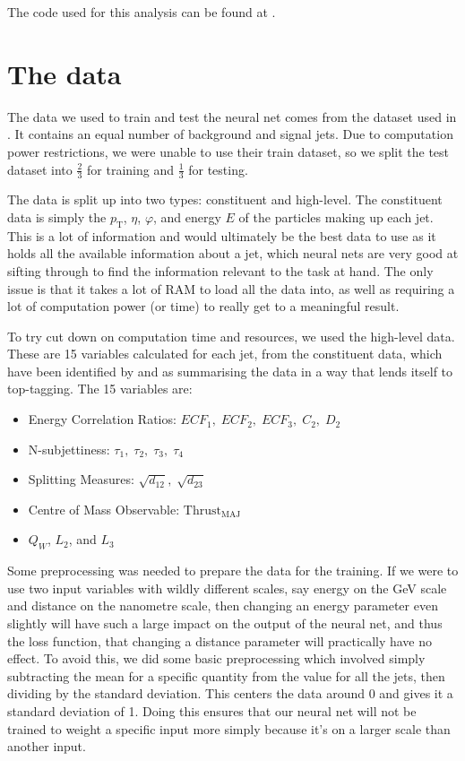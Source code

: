 \documentclass[11pt]{article}
\numberwithin{equation}{section}
\numberwithin{figure}{section}
\numberwithin{table}{section}
\begin{document}
The code used for this analysis can be found at \cite{proj_code}.

\section{The data}\label{sec:Data}
The data we used to train and test the neural net comes from the dataset used in \cite{top-tagging-data}. It contains an equal number of background and signal jets. Due to computation power restrictions, we were unable to use their train dataset, so we split the test dataset into $\frac 23$ for training and $\frac 13$ for testing.

The data is split up into two types: constituent and high-level. The constituent data is simply the $p_\mathrm{T}$, $\eta$, $\varphi$, and energy $E$ of the particles making up each jet. This is a lot of information and would ultimately be the best data to use as it holds all the available information about a jet, which neural nets are very good at sifting through to find the information relevant to the task at hand. The only issue is that it takes a lot of RAM to load all the data into, as well as requiring a lot of computation power (or time) to really get to a meaningful result. 

To try cut down on computation time and resources, we used the high-level data. These are 15 variables calculated for each jet, from the constituent data, which have been identified by \cite{ATL-PHYS-PUB-2021-028} and \cite{ATL-PHYS-PUB-2017-004} as summarising the data in a way that lends itself to top-tagging. The 15 variables are:

\begin{itemize}
    \item Energy Correlation Ratios: $ECF_1,\; ECF_2,\; ECF_3,\; C_2,\; D_2$
    \item N-subjettiness: $\tau_1,\; \tau_2,\; \tau_3,\; \tau_4$
    \item Splitting Measures: $\sqrt{d_{12}},\; \sqrt{d_{23}}$
    \item Centre of Mass Observable: $\mathrm{Thrust}_\mathrm{MAJ}$
    \item $Q_W$, $L_2$, and $L_3$
\end{itemize}

Some preprocessing was needed to prepare the data for the training. If we were to use two input variables with wildly different scales, say energy on the \si[]{\giga\electronvolt} scale and distance on the nanometre scale, then changing an energy parameter even slightly will have such a large impact on the output of the neural net, and thus the loss function, that changing a distance parameter will practically have no effect. To avoid this, we did some basic preprocessing which involved simply subtracting the mean for a specific quantity from the value for all the jets, then dividing by the standard deviation. This centers the data around 0 and gives it a standard deviation of 1. Doing this ensures that our neural net will not be trained to weight a specific input more simply because it's on a larger scale than another input.
\end{document}
